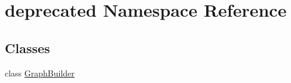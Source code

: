 \hypertarget{namespacedeprecated}{}\section{deprecated Namespace Reference}
\label{namespacedeprecated}
\subsection*{Classes}
\begin{DoxyCompactItemize}
\item 
class \mbox{\hyperlink{classdeprecated_1_1_graph_builder}{Graph\+Builder}}
\end{DoxyCompactItemize}
